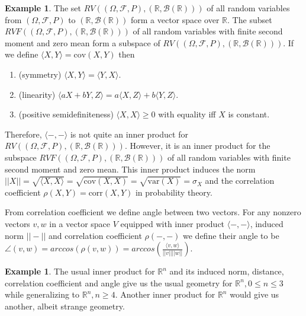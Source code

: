 \documentclass[12pt]{amsart}
\theoremstyle{definition}
\newtheorem{example}[theorem]{Example}
\begin{document}
\begin{example} The set $RV((\Omega, \mathcal{F},P), (\mathbb{R},\mathcal{B}(\mathbb{R})))$ of all random variables from $(\Omega, \mathcal{F},P)$ to $(\mathbb{R},\mathcal{B}(\mathbb{R}))$ form a vector space over $\mathbb{R}$. The subset $RVF((\Omega, \mathcal{F},P), (\mathbb{R},\mathcal{B}(\mathbb{R})))$ of all random variables with finite second moment and zero mean form a subspace of $RV((\Omega, \mathcal{F},P), (\mathbb{R},\mathcal{B}(\mathbb{R})))$. If we define $\langle X, Y \rangle = \text{cov}(X, Y)$ then
\begin{enumerate}[1.]
\item (symmetry) $\langle X, Y \rangle = \langle Y, X \rangle$.
\item (linearity) $\langle aX + bY, Z \rangle = a \langle X, Z \rangle + b \langle Y, Z \rangle$.
\item (positive semidefiniteness) $\langle X, X \rangle \geq 0$ with equality iff $X$ is constant.
\end{enumerate}

Therefore, $\langle -,- \rangle$ is not quite an inner product for $RV((\Omega, \mathcal{F},P), (\mathbb{R},\mathcal{B}(\mathbb{R})))$. However, it is an inner product for the subspace $RVF((\Omega, \mathcal{F},P), (\mathbb{R},\mathcal{B}(\mathbb{R})))$ of all random variables with finite second moment and zero mean. This inner product induces the norm $||X|| = \sqrt{\langle X, X \rangle} = \sqrt{\text{cov}(X,X)} = \sqrt{\text{var}(X)} = \sigma_X$ and the correlation coefficient $\rho(X, Y) = \text{corr}(X, Y)$ in probability theory. 
\end{example}

From correlation coefficient we define angle between two vectors.
\dfn For any nonzero vectors $v, w$ in a vector space $V$ equipped with inner product $\langle - , - \rangle$, induced norm $||-||$ and correlation coefficient $\rho(-, -)$ we define their angle to be $\angle(v, w) = arccos (\rho(v, w)) = arccos \left( \frac{\langle v, w \rangle}{||v|| ||w||} \right)$.

\begin{example} The usual inner product for $\mathbb{R}^n$ and its induced norm, distance, correlation coefficient and angle give us the usual geometry for $\mathbb{R}^n, 0 \leq n \leq 3$ while generalizing to $\mathbb{R}^n, n \geq 4$. Another inner product for $\mathbb{R}^n$ would give us another, albeit strange geometry.
\end{example}
\end{document}
